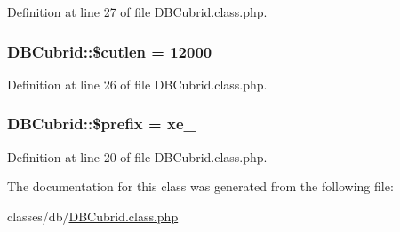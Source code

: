 Definition at line 27 of file D\+B\+Cubrid.\+class.\+php.

\hypertarget{classDBCubrid_a0f61a81aecf7cd9829d0fc390b2895a5}{}
\subsubsection[{\$cutlen}]{\setlength{\rightskip}{0pt plus 5cm}D\+B\+Cubrid\+::\$cutlen = 12000}\label{classDBCubrid_a0f61a81aecf7cd9829d0fc390b2895a5}


Definition at line 26 of file D\+B\+Cubrid.\+class.\+php.

\hypertarget{classDBCubrid_a78aa323ac3bf494cbc63d3a2ae05a6f5}{}
\subsubsection[{\$prefix}]{\setlength{\rightskip}{0pt plus 5cm}D\+B\+Cubrid\+::\$prefix = \textquotesingle{}xe\+\_\+\textquotesingle{}}\label{classDBCubrid_a78aa323ac3bf494cbc63d3a2ae05a6f5}


Definition at line 20 of file D\+B\+Cubrid.\+class.\+php.



The documentation for this class was generated from the following file\+:\begin{DoxyCompactItemize}
\item 
classes/db/\hyperlink{DBCubrid_8class_8php}{D\+B\+Cubrid.\+class.\+php}\end{DoxyCompactItemize}
